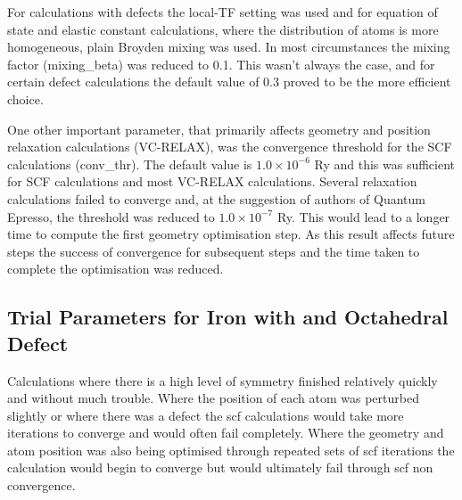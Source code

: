 For calculations with defects the local-TF setting was used and for equation of state and elastic constant calculations, where the distribution of atoms is more homogeneous, plain Broyden mixing was used.  In most circumstances the mixing factor (mixing\_beta) was reduced to 0.1.  This wasn't always the case, and for certain defect calculations the default value of 0.3 proved to be the more efficient choice.

One other important parameter, that primarily affects geometry and position relaxation calculations (VC-RELAX), was the convergence threshold for the SCF calculations (conv\_thr).  The default value is $1.0\times 10^{-6}$ Ry and this was sufficient for SCF calculations and most VC-RELAX calculations.  Several relaxation calculations failed to converge and, at the suggestion of authors of Quantum Epresso, the threshold was reduced to $1.0\times 10^{-7}$ Ry.  This would lead to a longer time to compute the first geometry optimisation step.  As this result affects future steps the success of convergence for subsequent steps and the time taken to complete the optimisation was reduced. 



\subsection{Trial Parameters for Iron with and Octahedral Defect}

Calculations where there is a high level of symmetry finished relatively quickly and without much trouble.  Where the position of each atom was perturbed slightly or where there was a defect the \acrshort{scf} calculations would take more iterations to converge and would often fail completely.  Where the geometry and atom position was also being optimised through repeated sets of \acrshort{scf} iterations the calculation would begin to converge but would ultimately fail through \acrshort{scf} non convergence.

